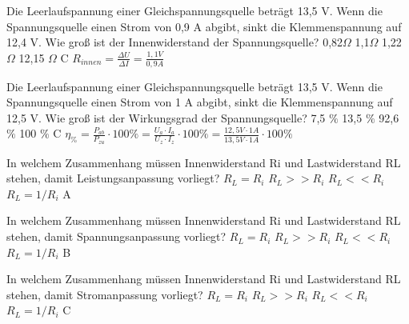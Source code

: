 {Die Leerlaufspannung  einer Gleichspannungsquelle beträgt 13,5 V. Wenn die Spannungsquelle einen Strom von 0,9 A abgibt, sinkt die Klemmenspannung auf 12,4 V. Wie groß ist der Innenwiderstand der Spannungsquelle?}%
{0,82$\Omega$}%
{1,1$\Omega$}%
{1,22 $\Omega$}%
{12,15 $\Omega$}%
{C \hspace{3em} $R_{innen} = \frac{\Delta U}{\Delta I} = \frac{1,1 V}{0,9 A}$}%

{Die Leerlaufspannung einer Gleichspannungsquelle beträgt 13,5 V. Wenn die Spannungsquelle einen Strom von 1 A abgibt, sinkt die Klemmenspannung auf 12,5 V. Wie groß ist der Wirkungsgrad der Spannungsquelle?}%
{7,5 $\%$}%
{13,5 $\%$}%
{92,6 $\%$}%
{100 $\%$}%
{C \hspace{3em} $\eta_\% = \frac{P_{ab}}{P_{zu}} \cdot 100\%
                 = \frac{U_a \cdot I_a}{U_z \cdot I_z} \cdot 100\%
                 = \frac{12,5 V \cdot 1 A}{13,5 V \cdot 1 A} \cdot 100\%$}%

{In welchem Zusammenhang müssen Innenwiderstand Ri und Lastwiderstand RL stehen, damit Leistungsanpassung vorliegt?}%
{$R_L = R_i$}%
{$R_L >> R_i$}%
{$R_L << R_i$}%
{$R_L = 1/R_i$}%
{A}%

{In welchem Zusammenhang müssen Innenwiderstand Ri und Lastwiderstand RL stehen, damit Spannungsanpassung vorliegt?}%
{$R_L = R_i$}%
{$R_L >> R_i$}%
{$R_L << R_i$}%
{$R_L = 1/R_i$}%
{B}%

{In welchem Zusammenhang müssen Innenwiderstand Ri und Lastwiderstand RL stehen, damit Stromanpassung vorliegt?}%
{$R_L = R_i$}%
{$R_L >> R_i$}%
{$R_L << R_i$}%
{$R_L = 1/R_i$}%
{C}%
